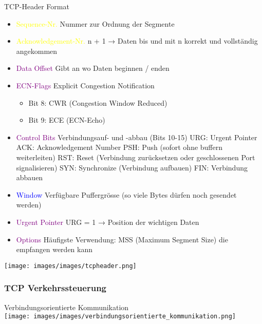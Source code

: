 \begin{concept}{TCP-Header Format}
    \begin{itemize}
        \item \textcolor{yellow}{Sequence-Nr.} Nummer zur Ordnung der Segmente
        \item \textcolor{yellow}{Acknowledgement-Nr.} n + 1 → Daten bis und mit n korrekt und vollständig angekommen
        \item \textcolor{purple}{Data Offset} Gibt an wo Daten beginnen / enden
        \item \textcolor{purple}{ECN-Flags} Explicit Congestion Notification
        \begin{itemize}
            \item Bit 8: CWR (Congestion Window Reduced)
            \item Bit 9: ECE (ECN-Echo)
        \end{itemize}
        \item \textcolor{purple}{Control Bits} Verbindungsauf- und -abbau (Bits 10-15)
        URG: Urgent Pointer
        ACK: Acknowledgement Number
        PSH: Push (sofort ohne buffern weiterleiten)
        RST: Reset (Verbindung zurücksetzen oder geschlossenen Port signalisieren)
        SYN: Synchronize (Verbindung aufbauen)
        FIN: Verbindung abbauen
        \item \textcolor{blue}{Window} Verfügbare Puffergrösse (so viele Bytes dürfen noch gesendet werden)
        \item \textcolor{purple}{Urgent Pointer} URG = 1 → Position der wichtigen Daten
        \item \textcolor{purple}{Options} Häufigste Verwendung: MSS (Maximum Segment Size) die empfangen werden kann
    \end{itemize}
    \texttt{[image: images/images/tcpheader.png]}
\end{concept}

\subsubsection{TCP Verkehrssteuerung}

\begin{concept}{Verbindungsorientierte Kommunikation}\\
    \texttt{[image: images/images/verbindungsorientierte\_kommunikation.png]}
\end{concept}

